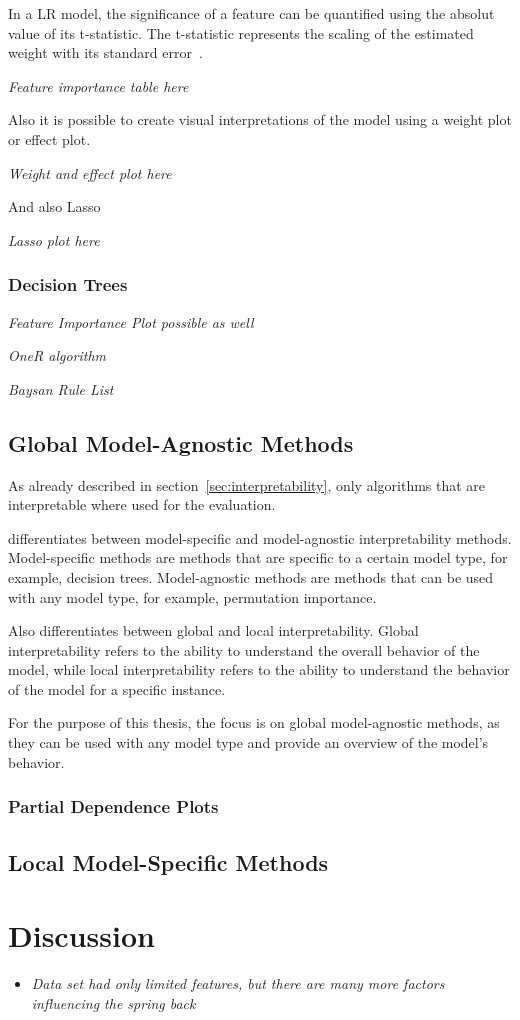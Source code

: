 In a \ac{LR} model, the significance of a feature can be quantified using the
absolut value of its t-statistic. The t-statistic represents the scaling of
the estimated weight with its standard error~\cite[p.
40]{molnar2020interpretable}.

\textit{Feature importance table here}

Also it is possible to create visual interpretations of the model using
a weight plot or effect plot.

\textit{Weight and effect plot here}

And also Lasso

\textit{Lasso plot here}

\subsubsection{Decision Trees}\label{subsubsec:decision-trees}

\textit{Feature Importance Plot possible as well}

\textit{OneR algorithm}

\textit{Baysan Rule List}


\subsection*{Global Model-Agnostic Methods}
As already described in section~\ref{sec:interpretability}, only algorithms
that are
interpretable where used for the evaluation.

\cite{molnar2020interpretable} differentiates between
model-specific and model-agnostic interpretability methods.
Model-specific methods are methods that are specific to a certain model type,
for example,
decision trees.
Model-agnostic methods are methods that can be used with any model type, for
example, permutation importance.

Also \cite{molnar2020interpretable} differentiates between global and local
interpretability. Global
interpretability refers to the ability to understand the overall behavior of
the model, while
local interpretability refers to the ability to understand the behavior of
the model for a
specific instance.

For the purpose of this thesis, the focus is on global model-agnostic
methods, as they can be used
with any model type and provide an overview of the model's behavior.

\subsubsection*{Partial Dependence Plots}

\subsection{Local Model-Specific
Methods}\label{subsec:local-model-specific-methods}

\section[]{Discussion}\label{sec:discussion}


\begin{itemize}
\item \textit{Data set had only limited features, but there are many more factors
influencing
the spring back}
\end{itemize}

